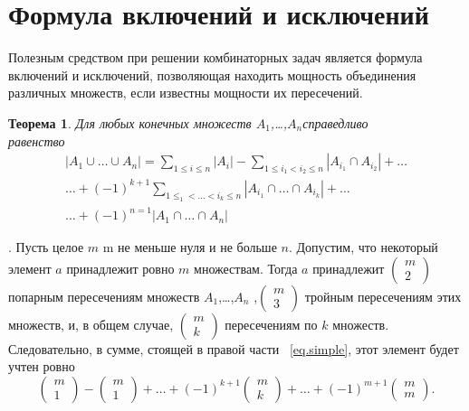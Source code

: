 \documentclass[14pt]{article}
\numberwithin{equation}{section}
\begin{document}
 \tableofcontents 
    \newpage
    \section{Формула включений и исключений} 
Полезным средством при решении комбинаторных задач является формула
включений и исключений, позволяющая находить мощность объединения
различных множеств, если известны мощности их пересечений.
\newtheorem{Th}{ Теорема}
\begin{Th}
Для любых конечных множеств $A_1$,\ldots,$A_n$справедливо \\равенство
\begin{equation}
\begin{split}
|A_1\cup\dots\cup A_n|=\sum_{1\le i \le n}|A_i|- \sum_{1\le i_1 < i_2 \le n}|A_{i_1} \cap A_{i_2}|+\ldots \\
\dots+(-1)^{k+1} \sum_{1 \le _1<\dots <i_k \le n}|A_{i_1}\cap\dots\cap A_{i_k}|+ \ldots \\ 
\dots+(-1)^{n=1}|A_1\cap\dots\cap A_n|
\label{eq.simple}
\end{split}
\end{equation}
\end{Th}
{}. Пусть целое $m$ m не меньше нуля и не больше $n$. Допустим, что некоторый элемент $a$ принадлежит ровно $m$ множествам. Тогда $a$ принадлежит $( \begin{smallmatrix} m\\2 \end{smallmatrix})$
попарным пересечениям множеств  $A_1$,\ldots,$A_n$ ,$( \begin{smallmatrix} m\\3 \end{smallmatrix})$ тройным пересечениям этих множеств, и, в общем случае, $( \begin{smallmatrix} m\\k \end{smallmatrix})$ пересечениям по $k$ множеств. Следовательно, в сумме, стоящей в правой части ~\eqref{eq.simple}, этот
элемент будет учтен ровно
\begin{equation}
\begin{pmatrix} m \\ 1  \end{pmatrix} -  \begin{pmatrix} m \\ 1  \end{pmatrix} + \dots + (-1)^{k+1} \begin{pmatrix} m \\ k \end{pmatrix} + \dots + (-1)^{m+1} \begin{pmatrix} m \\ m  \end{pmatrix}.
    \label{eq.second}
\end{equation}
\end{document}
